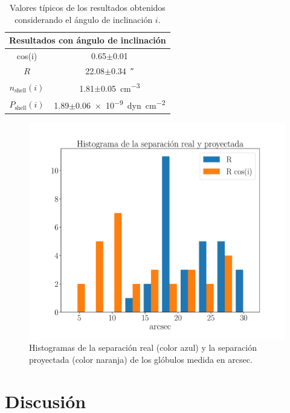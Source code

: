 \documentclass{book}
\begin{document}
\begin{table}[htb]
    \centering
    \begin{tabular}{c c}
        \toprule
        \multicolumn{2}{c}{Resultados con ángulo de inclinación} \\ \midrule
         cos(i) & 0.65$\pm$0.01 \\
         $R$ & 22.08$\pm$\SI{0.34}{\arcsecond}\\
         $n_\mathrm{shell}(i)$ & 1.81$\pm$\SI{0.05}{cm^{-3}}\\
         $P_\mathrm{shell}(i)$ & 1.89$\pm$\SI{0.06e-9}{dyn.cm^{-2}} \\
         \bottomrule
    \end{tabular}
    \caption{Valores típicos de los resultados obtenidos considerando el ángulo de inclinación $i$.}
    \label{tab:mean_i}
\end{table}

\begin{figure}[htb]
    \centering
    \includegraphics[width=\textwidth]{ultimos/Hist_seprarcion(1).pdf}
    \caption{Histogramas de la separación real (color azul) y la separación proyectada (color naranja) de los glóbulos medida en arcsec.}
    \label{fig:hist_sep_ryp}
\end{figure}


\chapter{Discusión}\label{Chp:conclusiones}
\end{document}
